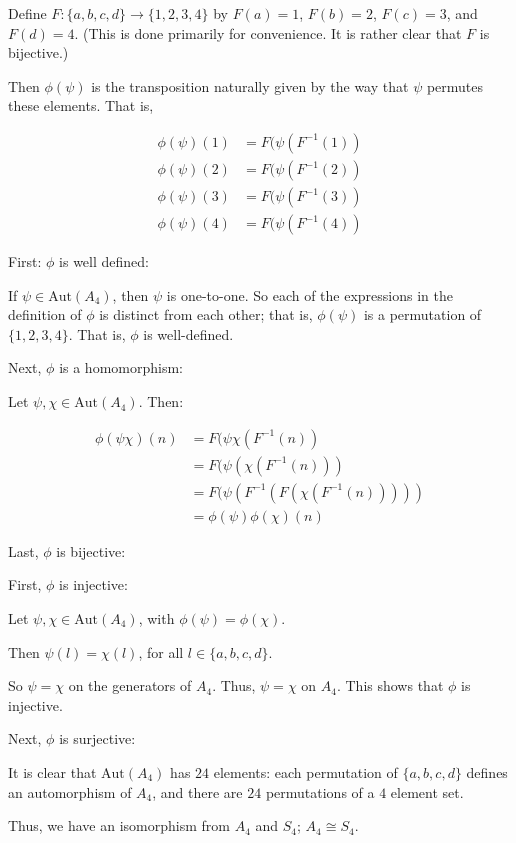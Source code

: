 \documentclass[a4paper,12pt]{article}
\newcommand{\tab}{\hspace{4mm}} %
\newcommand{\shunt}{\vspace{20mm}}
\begin{document}
\tab Define $F: \{a,b,c,d\} \to \{1,2,3,4\}$ by $F(a) =1$, $F(b) = 2$, $F(c) = 3$, and $F(d) = 4$. (This is done primarily for convenience. It is rather clear that $F$ is bijective.)

\tab Then $\phi(\psi)$ is the transposition naturally given by the way that $\psi$ permutes these elements. That is,

\begin{align*}
\phi(\psi)(1) &= F(\psi(F^{-1}(1)) \\
\phi(\psi)(2) &= F(\psi(F^{-1}(2)) \\
\phi(\psi)(3) &= F(\psi(F^{-1}(3)) \\
\phi(\psi)(4) &= F(\psi(F^{-1}(4)) 
\end{align*}

\tab First: $\phi$ is well defined:

\tab \tab If $\psi \in \text{Aut}(A_4)$, then $\psi$ is one-to-one. So each of the expressions in the definition of $\phi$ is distinct from each other; that is, $\phi(\psi)$ is a permutation of $\{1,2,3,4\}$. That is, $\phi$ is well-defined.

\tab Next, $\phi$ is a homomorphism:

\tab \tab Let $\psi, \chi \in \text{Aut}(A_4)$. Then:

\begin{align*}
\phi(\psi\chi)(n) &= F(\psi\chi(F^{-1}(n))\\
&= F(\psi(\chi(F^{-1}(n)))\\
&= F(\psi(F^{-1}(F(\chi(F^{-1}(n)))))\\
&= \phi(\psi)\phi(\chi)(n)
\end{align*}

\tab Last, $\phi$ is bijective:

\tab \tab First, $\phi$ is injective:

\tab \tab \tab Let $\psi, \chi \in \text{Aut}(A_4)$, with $\phi(\psi) = \phi(\chi)$.

\tab \tab \tab Then $\psi(l) = \chi(l)$, for all $l \in \{a,b,c,d\}$.

\tab \tab \tab So $\psi = \chi$ on the generators of $A_4$. Thus, $\psi=\chi$ on $A_4$. This shows that $\phi$ is injective.

\tab \tab Next, $\phi$ is surjective:

\tab \tab \tab It is clear that $\text{Aut}(A_4)$ has $24$ elements: each permutation of $\{a,b,c,d\}$ defines an automorphism of $A_4$, and there are $24$ permutations of a $4$ element set.

Thus, we have an isomorphism from $A_4$ and $S_4$; $A_4 \cong S_4$.

\shunt
\end{document}
